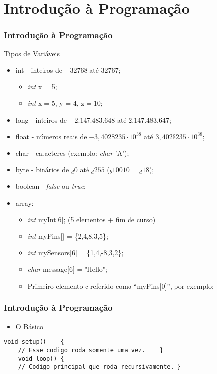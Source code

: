 \documentclass{beamer}
\begin{document}
\section{Introdução à Programação}
\begin{frame}
	\frametitle{Introdução à Programação}
	Tipos de Vari\'aveis
	\begin{itemize}
		\item int - inteiros de $-32768$ at\'e $32767$;
		\begin{itemize}
			\item \textit{int} x = 5;
			\item \textit{int} x = 5, y = 4, z = 10;
		\end{itemize}
		\item long - inteiros de $-2.147.483.648$ at\'e $2.147.483.647$;
		\item float - n\'umeros reais de $-3,4028235\cdot10^{38}$ at\'e $3,4028235\cdot10^{38}$;
		\item char - caracteres (exemplo: \textit{char} 'A');
		\item byte - binários de $_d0$ até $_d255$ ($_b10010$ = $_d18$);
		\item boolean - \textit{false} ou \textit{true};
		\item array:
		\begin{itemize}
			\item \textit{int} myInt[6]; (5 elementos + fim de curso)
			\item \textit{int} myPins[] = \{2,4,8,3,5\};
			\item \textit{int} mySensors[6] = \{1,4,-8,3,2\};
			\item \textit{char} message[6] = "Hello";
			\item Primeiro elemento é referido como ``myPins[0]'', por exemplo;
		\end{itemize}
	\end{itemize}
\end{frame}

\begin{frame}[fragile]
	\frametitle{Introdução à Programação}
	\begin{itemize}
		\item O B\'asico
	\end{itemize}

	\begin{lstlisting}[style=Arduino]
	void setup()	{
	// Esse codigo roda somente uma vez.	}
	void loop()	{
	// Codigo principal que roda recursivamente. }	\end{lstlisting}
\end{frame}
\end{document}
